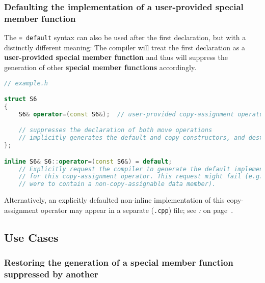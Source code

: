 \subsubsection[Defaulting the implementation of a user-provided special member function]{Defaulting the implementation of a user-provided special member function}\label{defaulting-the-implementation-of-a-user-provided-special-member-function}

The \texttt{=}~\texttt{default} syntax can also be used after the first
declaration, but with a distinctly different meaning: The compiler will
treat the first declaration as a \textbf{user-provided special member
function} and thus will suppress the generation of other
\textbf{special member functions} accordingly.

\begin{lstlisting}[language=C++,label=default-exampleh-code]
// example.h

struct S6
{
    S6& operator=(const S6&);  // user-provided copy-assignment operator

    // suppresses the declaration of both move operations
    // implicitly generates the default and copy constructors, and destructor
};

inline S6& S6::operator=(const S6&) = default;
    // Explicitly request the compiler to generate the default implementation
    // for this copy-assignment operator. This request might fail (e.g., if (ù{\codeincomments{S6}}ù)
    // were to contain a non-copy-assignable data member).
\end{lstlisting}

\noindent Alternatively, an explicitly defaulted non-inline implementation of this
copy-assignment operator may appear in a separate (\texttt{.cpp}) file;
see {\it{}: } on page~\pageref{physically-decoupling-the-interface-from-the-implementation}.

\subsection[Use Cases]{Use Cases}\label{default-use-cases}

\subsubsection[Restoring the generation of a special member function suppressed by another]{Restoring the generation of a special member function suppressed by another}\label{restoring-the-generation-of-a-special-member-function-suppressed-by-another}


